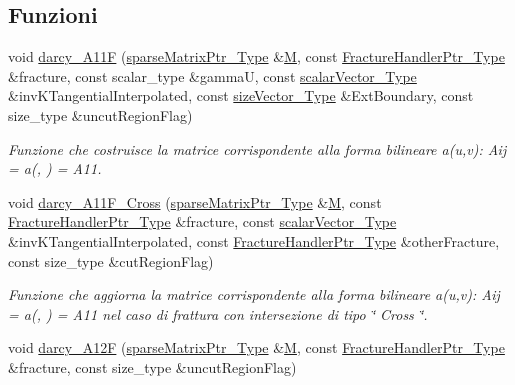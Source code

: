 \subsection*{Funzioni}
\begin{DoxyCompactItemize}
\item 
void \hyperlink{namespacegetfem_aba6f1b4f1d395aae3d96071cad4953a2}{darcy\-\_\-\-A11\-F} (\hyperlink{Core_8h_a87137a9501b38c724ac80bc955164bb7}{sparse\-Matrix\-Ptr\-\_\-\-Type} \&\hyperlink{matrici_8m_aa3fcd1f5ca38bf1f708720d0a9481e05}{M}, const \hyperlink{FractureHandler_8h_af23fb7a30aaff864bd42587af4f1e78a}{Fracture\-Handler\-Ptr\-\_\-\-Type} \&fracture, const scalar\-\_\-type \&gamma\-U, const \hyperlink{Core_8h_a4e75b5863535ba1dd79942de2846eff0}{scalar\-Vector\-\_\-\-Type} \&inv\-K\-Tangential\-Interpolated, const \hyperlink{Core_8h_a83c51913d041a5001e8683434c09857f}{size\-Vector\-\_\-\-Type} \&Ext\-Boundary, const size\-\_\-type \&uncut\-Region\-Flag)
\begin{DoxyCompactList}\small\item\em Funzione che costruisce la matrice corrispondente alla forma bilineare a(u,v)\-: Aij = a(, ) = A11. \end{DoxyCompactList}\item 
void \hyperlink{namespacegetfem_a9b6ded8fe1019aa04e66d2047d0f29dd}{darcy\-\_\-\-A11\-F\-\_\-\-Cross} (\hyperlink{Core_8h_a87137a9501b38c724ac80bc955164bb7}{sparse\-Matrix\-Ptr\-\_\-\-Type} \&\hyperlink{matrici_8m_aa3fcd1f5ca38bf1f708720d0a9481e05}{M}, const \hyperlink{FractureHandler_8h_af23fb7a30aaff864bd42587af4f1e78a}{Fracture\-Handler\-Ptr\-\_\-\-Type} \&fracture, const \hyperlink{Core_8h_a4e75b5863535ba1dd79942de2846eff0}{scalar\-Vector\-\_\-\-Type} \&inv\-K\-Tangential\-Interpolated, const \hyperlink{FractureHandler_8h_af23fb7a30aaff864bd42587af4f1e78a}{Fracture\-Handler\-Ptr\-\_\-\-Type} \&other\-Fracture, const size\-\_\-type \&cut\-Region\-Flag)
\begin{DoxyCompactList}\small\item\em Funzione che aggiorna la matrice corrispondente alla forma bilineare a(u,v)\-: Aij = a(, ) = A11 nel caso di frattura con intersezione di tipo \char`\"{} Cross \char`\"{}. \end{DoxyCompactList}\item 
void \hyperlink{namespacegetfem_ab62aa98cfcf55810e1518906202cbedc}{darcy\-\_\-\-A12\-F} (\hyperlink{Core_8h_a87137a9501b38c724ac80bc955164bb7}{sparse\-Matrix\-Ptr\-\_\-\-Type} \&\hyperlink{matrici_8m_aa3fcd1f5ca38bf1f708720d0a9481e05}{M}, const \hyperlink{FractureHandler_8h_af23fb7a30aaff864bd42587af4f1e78a}{Fracture\-Handler\-Ptr\-\_\-\-Type} \&fracture, const size\-\_\-type \&uncut\-Region\-Flag)

\end{DoxyCompactItemize}
